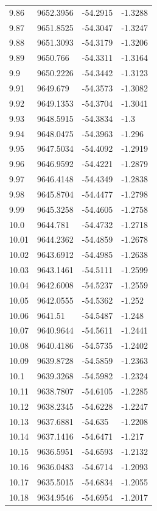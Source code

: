 \begin{table}[H]
\begin{tabular}{llll}
9.86 & 9652.3956 & -54.2915 & -1.3288 \\
9.87 & 9651.8525 & -54.3047 & -1.3247 \\
9.88 & 9651.3093 & -54.3179 & -1.3206 \\
9.89 & 9650.766 & -54.3311 & -1.3164 \\
9.9 & 9650.2226 & -54.3442 & -1.3123 \\
9.91 & 9649.679 & -54.3573 & -1.3082 \\
9.92 & 9649.1353 & -54.3704 & -1.3041 \\
9.93 & 9648.5915 & -54.3834 & -1.3 \\
9.94 & 9648.0475 & -54.3963 & -1.296 \\
9.95 & 9647.5034 & -54.4092 & -1.2919 \\
9.96 & 9646.9592 & -54.4221 & -1.2879 \\
9.97 & 9646.4148 & -54.4349 & -1.2838 \\
9.98 & 9645.8704 & -54.4477 & -1.2798 \\
9.99 & 9645.3258 & -54.4605 & -1.2758 \\
10.0 & 9644.781 & -54.4732 & -1.2718 \\
10.01 & 9644.2362 & -54.4859 & -1.2678 \\
10.02 & 9643.6912 & -54.4985 & -1.2638 \\
10.03 & 9643.1461 & -54.5111 & -1.2599 \\
10.04 & 9642.6008 & -54.5237 & -1.2559 \\
10.05 & 9642.0555 & -54.5362 & -1.252 \\
10.06 & 9641.51 & -54.5487 & -1.248 \\
10.07 & 9640.9644 & -54.5611 & -1.2441 \\
10.08 & 9640.4186 & -54.5735 & -1.2402 \\
10.09 & 9639.8728 & -54.5859 & -1.2363 \\
10.1 & 9639.3268 & -54.5982 & -1.2324 \\
10.11 & 9638.7807 & -54.6105 & -1.2285 \\
10.12 & 9638.2345 & -54.6228 & -1.2247 \\
10.13 & 9637.6881 & -54.635 & -1.2208 \\
10.14 & 9637.1416 & -54.6471 & -1.217 \\
10.15 & 9636.5951 & -54.6593 & -1.2132 \\
10.16 & 9636.0483 & -54.6714 & -1.2093 \\
10.17 & 9635.5015 & -54.6834 & -1.2055 \\
10.18 & 9634.9546 & -54.6954 & -1.2017 \\

\end{tabular}
\end{table}
